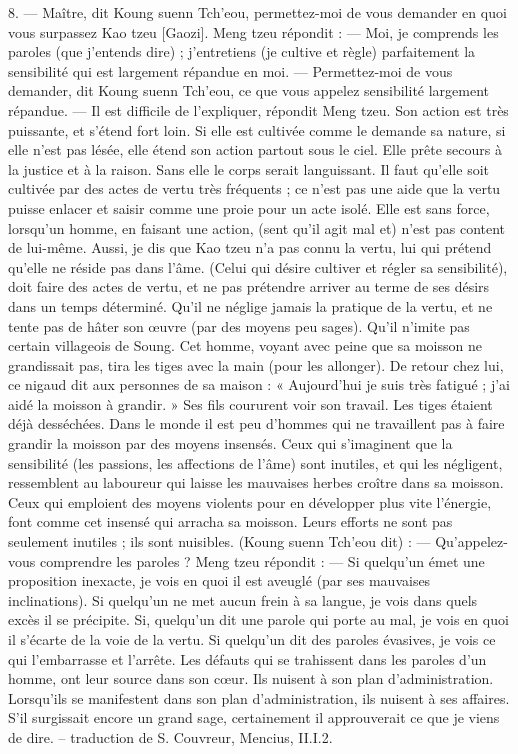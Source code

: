 \begin{singlequote}
   8.	— Maître, dit Koung suenn Tch’eou, permettez-moi de vous demander en quoi vous surpassez Kao tzeu [Gaozi].
Meng tzeu répondit :
—	Moi, je comprends les paroles (que j’entends dire) ; j’entretiens (je cultive et règle) parfaitement la sensibilité qui est largement répandue en moi.
—	Permettez-moi de vous demander, dit Koung suenn Tch’eou, ce que vous appelez sensibilité largement répandue.
—	Il est difficile de l’expliquer, répondit Meng tzeu. Son action est très puissante, et s’étend fort loin. Si elle est cultivée comme le demande sa nature, si elle n’est pas lésée, elle étend son action partout sous le ciel. Elle prête secours à la justice et à la raison. Sans elle le corps serait languissant.
Il faut qu’elle soit cultivée par des actes de vertu très fréquents ; ce n’est pas une aide que la vertu puisse enlacer et saisir comme une proie pour un acte isolé. Elle est sans force, lorsqu’un homme, en faisant une action, (sent qu’il agit mal et) n’est pas content de lui-même. Aussi, je dis que Kao tzeu n’a pas connu la vertu, lui qui prétend qu’elle ne réside pas dans l’âme.
(Celui qui désire cultiver et régler sa sensibilité), doit faire des actes de vertu, et ne pas prétendre arriver au terme de ses désirs dans un temps déterminé. Qu’il ne néglige jamais la pratique de la vertu, et ne tente pas de hâter son œuvre (par des moyens peu sages). Qu’il n’imite pas certain villageois de Soung. Cet homme, voyant avec peine que sa moisson ne grandissait pas, tira les tiges avec la main (pour les allonger). De retour chez lui, ce nigaud dit aux personnes de sa maison :
« Aujourd’hui je suis très fatigué ; j’ai aidé la moisson à grandir. » Ses fils coururent voir son
travail. Les tiges étaient déjà desséchées. Dans le monde il est peu d’hommes qui ne travaillent pas à faire grandir la moisson par des moyens insensés. Ceux qui s’imaginent que la sensibilité (les passions, les affections de l’âme) sont inutiles, et qui les négligent, ressemblent au laboureur qui laisse les mauvaises herbes croître dans sa moisson. Ceux qui emploient des moyens violents pour en développer plus vite l’énergie, font comme cet insensé qui arracha sa moisson. Leurs efforts ne sont pas seulement inutiles ; ils sont nuisibles.
(Koung suenn Tch’eou dit) :
—	Qu’appelez-vous comprendre les paroles ?
Meng tzeu répondit :
—	Si quelqu’un émet une proposition inexacte, je vois en quoi il est aveuglé (par ses mauvaises inclinations). Si quelqu’un ne met aucun frein à sa langue, je vois dans quels excès il se précipite. Si, quelqu’un dit une parole qui porte au mal, je vois en quoi il s’écarte de la voie de la vertu. Si quelqu’un dit des paroles évasives, je vois ce qui l’embarrasse et l’arrête. Les défauts qui se trahissent dans les paroles d’un homme, ont leur source dans son cœur. Ils nuisent à son plan d’administration. Lorsqu’ils se manifestent dans son plan d’administration, ils nuisent à ses affaires. S’il surgissait encore un grand sage, certainement il approuverait ce que je viens de dire.
-- traduction de S. Couvreur, Mencius, II.I.2. 
\end{singlequote}

